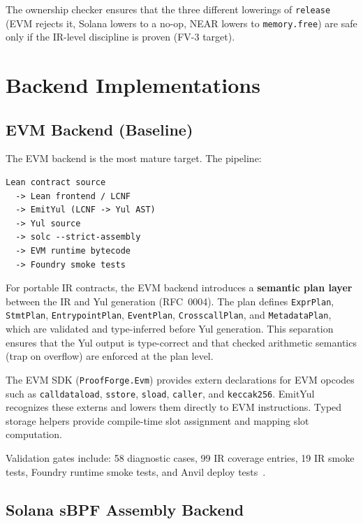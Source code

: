 \documentclass[sigconf]{acmart}
\begin{document}
The ownership checker ensures that the three different lowerings of \texttt{release}
(EVM rejects it, Solana lowers to a no-op, NEAR lowers to \texttt{memory.free}) are safe
only if the IR-level discipline is proven (FV-3 target).

\section{Backend Implementations}
\label{sec:backends}

\subsection{EVM Backend (Baseline)}

The EVM backend is the most mature target. The pipeline:

\begin{lstlisting}[style=textcode]
Lean contract source
  -> Lean frontend / LCNF
  -> EmitYul (LCNF -> Yul AST)
  -> Yul source
  -> solc --strict-assembly
  -> EVM runtime bytecode
  -> Foundry smoke tests
\end{lstlisting}

For portable IR contracts, the EVM backend introduces a \textbf{semantic plan layer} between
the IR and Yul generation (RFC~0004). The plan defines \texttt{ExprPlan}, \texttt{StmtPlan},
\texttt{EntrypointPlan}, \texttt{EventPlan}, \texttt{CrosscallPlan}, and \texttt{MetadataPlan},
which are validated and type-inferred before Yul generation. This separation ensures that the
Yul output is type-correct and that checked arithmetic semantics (trap on overflow) are
enforced at the plan level.

The EVM SDK (\texttt{ProofForge.Evm}) provides extern declarations for EVM opcodes such as
\texttt{calldataload}, \texttt{sstore}, \texttt{sload}, \texttt{caller}, and \texttt{keccak256}.
EmitYul recognizes these externs and lowers them directly to EVM instructions. Typed
storage helpers provide compile-time slot assignment and mapping slot computation.

Validation gates include: 58 diagnostic cases, 99 IR coverage entries, 19 IR smoke tests,
Foundry runtime smoke tests, and Anvil deploy tests~\cite{foundry}.

\subsection{Solana sBPF Assembly Backend}
\end{document}
